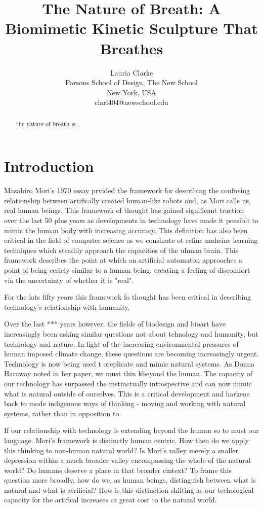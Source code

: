 \documentclass[letterpaper]{article}
\title{The Nature of Breath: A Biomimetic Kinetic Sculpture That Breathes}
\author{Lauria Clarke\\ Parsons School of Design, The New School\\ New York, USA\\ clarl404@newschool.edu\\
\newline
\newline
}
\begin{document}
 
\maketitle

\begin{abstract}
the nature of breath is...
\end{abstract}


\section{Introduction}


Masahiro Mori's 1970 essay prvided the framework for describing the confusing relationship between artifically created human-like robots and, as Mori calls us, real human beings. \cite{mori} This framework of thought has gained significant traction over the last 50 plus years as developments in technology have made it possiblt to mimic the human body with increasing accuracy. This definition has also been critical in the field of computer science as we consinute ot refine mahcine learning techniques which steadily approach the capacities of the uhman brain. This framework describes the point at which an artificial automaton approaches a point of being eeriely similar to a human being, creating a feeling of discomfort via the uncertainty of whether it is "real".

For the lats fifty years this framework fo thought has been critical in describing technology's relationship with humanity. 

Over the last *** years however, the fields of biodesign and bioart have increasingly been asking similar questions not about tchnology and humanity, but technology and nature. In light of the increasing environmental pressures of human imposed climate change, these questions are becoming increasingly urgent. Technology is now being used t oreplicate and mimic natural systems. As Donna Haraway noted in her paper, we must thin kbeyond the human. \cite{haraway} The capacity of our technology has surpassed the instinctually introspective and can now mimic what is natural outside of ourselves. This is a critical development and harkens back to mode indigenous ways of thinking - moving and working with natural systems, rather than in opposition to. 

If our relationship with technology is extending beyond the human so to must our language. Mori's framework is distinctly human centric. How then do we apply this thinking to non-human natural world? Is Mori's valley merely a snaller depression within a much broader valley encompassing the whole of the natural world? Do humans deserve a place in that broader cintext? To frame this question more broadly, how do we, as human beings, distinguish between what is natural and what is atrificial? How is this distinction shifting as our techological capacity for the artifical increases at great cost to the natural world. 
\end{document}
